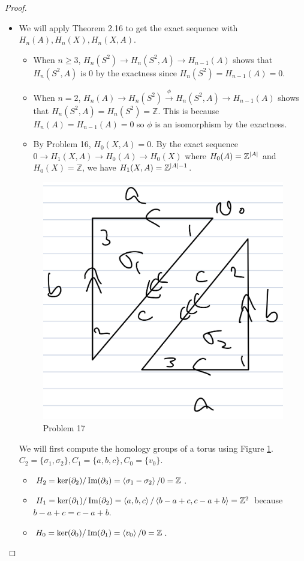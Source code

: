 \documentclass[12pt, psamsfonts]{amsart}
\theoremstyle{definition}
\theoremstyle{remark}
\numberwithin{equation}{section}
\begin{document}
\begin{proof}
  $ $
  \begin{itemize}
    \item
      We will apply Theorem 2.16 to get the exact sequence with $H_n(A), H_n(X), H_n(X, A)$.
      \begin{itemize}
        \item
          When $n \geq 3$, $H_n(S^2) \rightarrow H_n(S^2, A) \rightarrow H_{n - 1}(A)$ shows that $H_n(S^2, A)$ is 0 by the exactness since $H_n(S^2) = H_{n - 1}(A) = 0$.
        \item
          When $n = 2$, $H_n(A) \rightarrow H_n(S^2) \xrightarrow{\phi} H_n(S^2, A) \rightarrow H_{n - 1}(A)$ shows that $H_n(S^2, A) = H_n(S^2) = \mathbb{Z}$.
          This is because $H_n(A) = H_{n - 1}(A) = 0$ so $\phi$ is an isomorphism by the exactness.
        \item
          By Problem 16, $H_0(X, A) = 0$.
          By the exact sequence $0 \rightarrow H_1(X, A) \rightarrow H_0(A) \rightarrow H_0(X)$ where $H_0(A) = \mathbb{Z}^{\abs{A}}$ and $H_0(X) = \mathbb{Z}$, we have $H_1(X, A) = \mathbb{Z}^{\abs{A} - 1}$.
      \end{itemize}

      \begin{figure}
        \includegraphics[width=.5\linewidth]{torus_homology.jpeg}
        \caption{Problem 17}
        \label{fig:torus_homology}
      \end{figure}
      We will first compute the homology groups of a torus using Figure \ref{fig:torus_homology}.
      $C_2 = \{ \sigma_1, \sigma_2 \}, C_1 = \{ a, b, c \}, C_0 = \{ v_0 \}$.
      \begin{itemize}
        \item
          $H_2 = \ker(\partial_2) / \Im(\partial_3) = \ev{ \sigma_1 - \sigma_2 } / 0 = \mathbb{Z}$.
        \item
          $H_1 = \ker(\partial_1) / \Im(\partial_2) = \ev{ a, b, c } / \ev{ b - a + c, c - a + b } = \mathbb{Z}^2$ because $b - a + c = c - a + b$.
        \item
          $H_0 = \ker(\partial_0) / \Im(\partial_1) = \ev{ v_0 } / 0 = \mathbb{Z}$.
     \end{itemize}


\end{itemize}
\end{proof}
\end{document}
